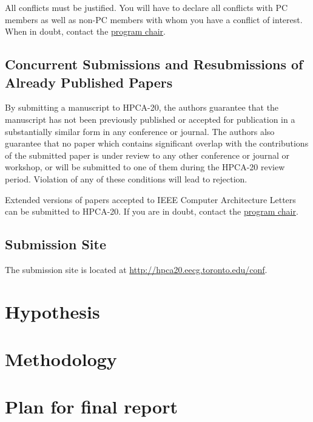 \documentclass[pageno]{jpaper}
\begin{document}
All conflicts must be justified.
You will have to declare all conflicts with PC members as well as non-PC members 
with whom you
have a conflict of interest.  When in doubt, contact the \href{mailto:enright@eecg.toronto.edu}{program chair}.

\subsection{Concurrent Submissions and Resubmissions of Already Published Papers}

By submitting a manuscript to HPCA-20, the authors guarantee that the
manuscript has not been previously published or accepted for publication in a
substantially similar form in any conference or journal. The authors also
guarantee that no paper which contains significant overlap with the
contributions of the submitted paper is under review to any other conference or
journal or workshop, or will be submitted to one of them during the HPCA-20
review period. Violation of any of these conditions will lead to rejection.

Extended versions of papers accepted to IEEE Computer Architecture Letters can
be submitted to HPCA-20.  If you are in doubt, contact the \href{mailto:enright@eecg.toronto.edu}{program chair}.

\subsection{Submission Site}

The submission site is located at \url{http://hpca20.eecg.toronto.edu/conf}.

\section{Hypothesis}

\section{Methodology}

\section{Plan for final report}



\end{document}
